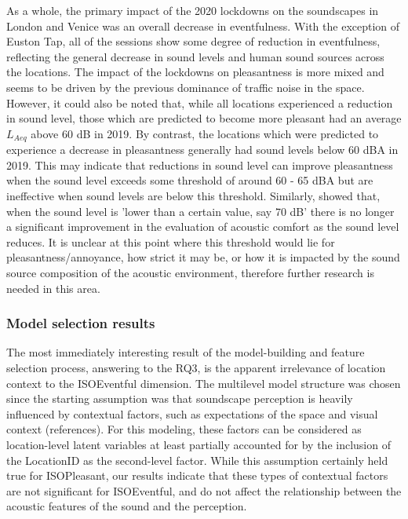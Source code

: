 As a whole, the primary impact of the 2020 lockdowns on the soundscapes in London and Venice was an overall decrease in eventfulness. With the exception of Euston Tap, all of the sessions show some degree of reduction in eventfulness, reflecting the general decrease in sound levels and human sound sources across the locations. The impact of the lockdowns on pleasantness is more mixed and seems to be driven by the previous dominance of traffic noise in the space. However, it could also be noted that, while all locations experienced a reduction in sound level, those which are predicted to become more pleasant had an average $L_{Aeq}$ above 60 dB in 2019. By contrast, the locations which were predicted to experience a decrease in pleasantness generally had sound levels below 60 dBA in 2019. This may indicate that reductions in sound level can improve pleasantness when the sound level exceeds some threshold of around 60 - 65 dBA but are ineffective when sound levels are below this threshold. Similarly, \citet{Yang2005Acoustic} showed that, when the sound level is 'lower than a certain value, say 70 dB' there is no longer a significant improvement in the evaluation of acoustic comfort as the sound level reduces. It is unclear at this point where this threshold would lie for pleasantness/annoyance, how strict it may be, or how it is impacted by the sound source composition of the acoustic environment, therefore further research is needed in this area.

\subsubsection{Model selection results}

The most immediately interesting result of the model-building and feature selection process, answering to the RQ3, is the apparent irrelevance of location context to the ISOEventful dimension. The multilevel model structure was chosen since the starting assumption was that soundscape perception is heavily influenced by contextual factors, such as expectations of the space and visual context (references). For this modeling, these factors can be considered as location-level latent variables at least partially accounted for by the inclusion of the LocationID as the second-level factor. While this assumption certainly held true for ISOPleasant, our results indicate that these types of contextual factors are not significant for ISOEventful, and do not affect the relationship between the acoustic features of the sound and the perception.

